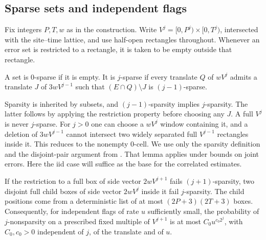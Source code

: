 \subsection{Sparse sets and independent flags}

Fix integers \(P,T,w\) as in the construction. Write \(V^j=[0,P^j)\times[0,T^j)\), intersected with the site--time lattice, and use half-open rectangles throughout. Whenever an error set is restricted to a rectangle, it is taken to be empty outside that rectangle.

\begin{definition}[Sparsity]\label{def:sparse}
A set is \(0\)-sparse if it is empty. It is \(j\)-sparse if every translate \(Q\) of \(wV^j\) admits a translate \(J\) of \(3wV^{j-1}\) such that \((E\cap Q)\setminus J\) is \((j-1)\)-sparse.
\end{definition}

Sparsity is inherited by subsets, and \((j-1)\)-sparsity implies \(j\)-sparsity. The latter follows by applying the restriction property before choosing any \(J\). A full \(V^j\) is never \(j\)-sparse. For \(j>0\) one can choose a \(wV^j\) window containing it, and a deletion of \(3wV^{j-1}\) cannot intersect two widely separated full \(V^{j-1}\) rectangles inside it. This reduces to the nonempty \(0\)-cell. We use only the sparsity definition and the disjoint-pair argument from \cite[Section~4, Lemma~4.1]{gacs86}. That lemma applies under bounds on joint errors. Here the iid case will suffice as the base for the correlated estimates.

\begin{lemma}\label{lem:sparse-witness}
If the restriction to a full box of side vector \(2wV^{j+1}\) fails \((j+1)\)-sparsity, two disjoint full child boxes of side vector \(2wV^j\) inside it fail \(j\)-sparsity. The child positions come from a deterministic list of at most \( (2P+3)(2T+3)\) boxes. Consequently, for independent flags of rate \(u\) sufficiently small, the probability of \(j\)-nonsparsity on a prescribed fixed multiple of \(V^{j+1}\) is at most \(C_0 u^{c_0 2^j}\), with \(C_0,c_0>0\) independent of \(j\), of the translate and of \(u\).
\end{lemma}

